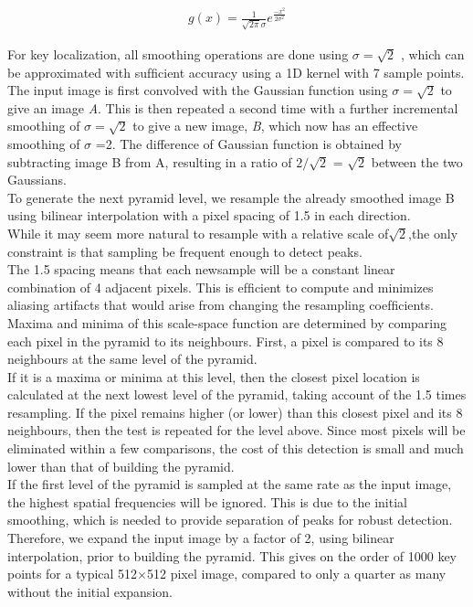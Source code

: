 \begin{align}
     g(x)  =\frac{1}{\sqrt{2\pi}\sigma} e^\frac{-x^2}{2\sigma^2}
\end{align}


For key localization, all smoothing operations are done using
$\sigma = \sqrt{2}$ , which can be approximated with sufﬁcient accuracy
using a 1D kernel with 7 sample points.\\
The input image is first convolved with the Gaussian
function using $\sigma = \sqrt{2}$ to give an image \textit{A}. This is then
repeated a second time with a further incremental smoothing
of $\sigma = \sqrt{2}$ to give a new image, \textit{B}, which now has an
effective smoothing of $\sigma$ =2. The difference of Gaussian
function is obtained by subtracting image B from A, resulting
in a ratio of $2/\sqrt{2}$ = $ \sqrt{2}$ between the two Gaussians.\\
To generate the next pyramid level, we resample the already smoothed image B using bilinear interpolation with a
pixel spacing of 1.5 in each direction.\\ While it may seem
more natural to resample with a relative scale of$\sqrt{2}$,the
only constraint is that sampling be frequent enough to detect
peaks.\\ The 1.5 spacing means that each newsample will
be a constant linear combination of 4 adjacent pixels. This
is efﬁcient to compute and minimizes aliasing artifacts that
would arise from changing the resampling coefﬁcients.\\
Maxima and minima of this scale-space function are determined
by comparing each pixel in the pyramid to its
neighbours. First, a pixel is compared to its 8 neighbours at
the same level of the pyramid.\\ If it is a maxima or minima
at this level, then the closest pixel location is calculated at
the next lowest level of the pyramid, taking account of the
1.5 times resampling. If the pixel remains higher (or lower)
than this closest pixel and its 8 neighbours, then the test is
repeated for the level above. Since most pixels will be eliminated
within a few comparisons, the cost of this detection is
small and much lower than that of building the pyramid.\\
If the first level of the pyramid is sampled at the same rate
as the input image, the highest spatial frequencies will be ignored.
This is due to the initial smoothing, which is needed
to provide separation of peaks for robust detection. Therefore,
we expand the input image by a factor of 2, using bilinear
interpolation, prior to building the pyramid. This gives
on the order of 1000 key points for a typical
512$\times$512 pixel
image, compared to only a quarter as many without the initial
expansion.
